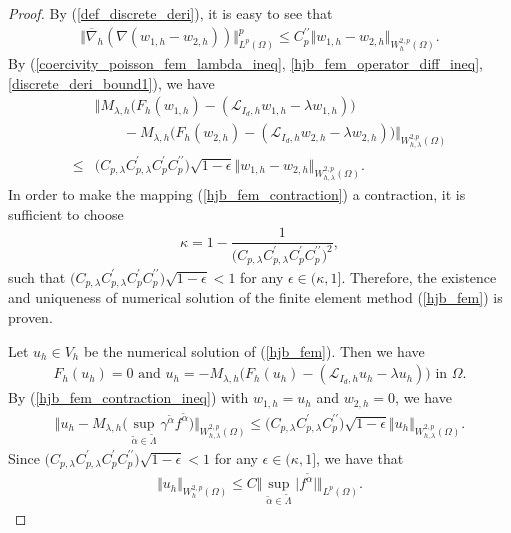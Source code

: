 \documentclass[12pt]{amsart}
\theoremstyle{definition}
\theoremstyle{remark}
\begin{document}
\begin{proof}
By (\ref{def_discrete_deri}), it is easy to see that 
\begin{align}
\label{discrete_deri_bound1}
\Vert \overline{\nabla}_{h}(\nabla (w_{1,h}-w_{2,h})) 
\Vert_{L^{p}(\Omega)}^{p} \leq C_{p}^{\prime\prime} 
\Vert w_{1,h}-w_{2,h}\Vert_{W_{h}^{2,p}(\Omega)}.
\end{align}
By (\ref{coercivity_poisson_fem_lambda_ineq}, \ref{hjb_fem_operator_diff_ineq},
\ref{discrete_deri_bound1}), we have 
\begin{align}
\label{hjb_fem_contraction_ineq}
& \Vert M_{\lambda,h}\big(F_{h}(w_{1,h})-(\mathcal{L}_{I_{d},h}w_{1,h}-\lambda 
w_{1,h})\big)\\
\nonumber
&\qquad - M_{\lambda,h}\big(F_{h}(w_{2,h})-(\mathcal{L}_{I_{d},h}w_{2,h}-\lambda 
w_{2,h})\big)\Vert_{W_{h,\lambda}^{2.p}(\Omega)} \\
\nonumber
\leq & \big( C_{p,\lambda}C_{p,\lambda}^{\prime}C_{p}^{\prime}
C_{p}^{\prime\prime}\big)
\sqrt{1-\epsilon}\Vert w_{1,h}-w_{2,h}\Vert_{W_{h,\lambda}^{2,p}(\Omega)}.
\end{align}
In order to make the mapping (\ref{hjb_fem_contraction}) a contraction, 
it is sufficient to choose 
\begin{align}
\label{def_kappa}
\kappa = 1 - \dfrac{1}{\big( C_{p,\lambda}
C_{p,\lambda}^{\prime}C_{p}^{\prime}C_{p}^{\prime\prime}\big)^{2}},
\end{align}
such that $\big( C_{p,\lambda}C_{p,\lambda}^{\prime}C_{p}^{\prime}
C_{p}^{\prime\prime}\big)
\sqrt{1-\epsilon}<1$ for any $\epsilon \in (\kappa,1]$.
Therefore, the existence and uniqueness of numerical solution of 
the finite element method (\ref{hjb_fem}) is proven. 

Let $u_{h}\in V_{h}$ be the numerical solution of (\ref{hjb_fem}). 
Then we have 
\begin{align*}
F_{h}(u_{h}) = 0 \text{ and }
u_{h} = - M_{\lambda,h}\big(F_{h}(u_{h})-(\mathcal{L}_{I_{d},h}u_{h}-\lambda 
u_{h})\big) \text{ in }\Omega.
\end{align*}
By (\ref{hjb_fem_contraction_ineq}) with $w_{1,h}=u_{h}$ and 
$w_{2,h} = 0$, we have 
\begin{align*}
\Vert u_{h} - M_{\lambda,h}\big( \sup_{\tilde{\alpha}\in \tilde{\Lambda}}
\gamma^{\tilde{\alpha}} f^{\tilde{\alpha}}\big)\Vert_{W_{h,\lambda}^{2,p}(\Omega)} 
\leq \big( C_{p,\lambda}C_{p,\lambda}^{\prime}C_{p}^{\prime\prime}\big)
\sqrt{1-\epsilon}\Vert u_{h}\Vert_{W_{h,\lambda}^{2,p}(\Omega)}.
\end{align*}
Since $\big( C_{p,\lambda}C_{p,\lambda}^{\prime}C_{p}^{\prime}
C_{p}^{\prime\prime}\big)
\sqrt{1-\epsilon}<1$ for any $\epsilon \in (\kappa,1]$, we have that 
\begin{align}
\label{hjb_numerical_sol_bound1}
\Vert u_{h}\Vert_{W^{2,p}_{h}(\Omega)} \leq C \Vert 
\sup_{\tilde{\alpha}\in \tilde{\Lambda}}\vert f^{\tilde{\alpha}}\vert 
\Vert_{L^{p}(\Omega)}.
\end{align}


\end{proof}
\end{document}
